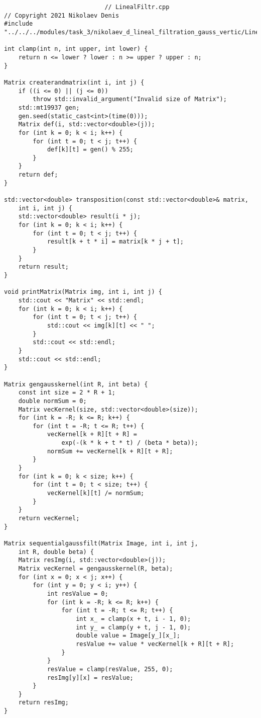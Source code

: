 \documentclass{report}
\begin{document}
\begin{lstlisting}
							// LinealFiltr.cpp
// Copyright 2021 Nikolaev Denis
#include "../../../modules/task_3/nikolaev_d_lineal_filtration_gauss_vertic/LinealFiltr.h"

int clamp(int n, int upper, int lower) {
    return n <= lower ? lower : n >= upper ? upper : n;
}

Matrix createrandmatrix(int i, int j) {
    if ((i <= 0) || (j <= 0))
        throw std::invalid_argument("Invalid size of Matrix");
    std::mt19937 gen;
    gen.seed(static_cast<int>(time(0)));
    Matrix def(i, std::vector<double>(j));
    for (int k = 0; k < i; k++) {
        for (int t = 0; t < j; t++) {
            def[k][t] = gen() % 255;
        }
    }
    return def;
}

std::vector<double> transposition(const std::vector<double>& matrix,
    int i, int j) {
    std::vector<double> result(i * j);
    for (int k = 0; k < i; k++) {
        for (int t = 0; t < j; t++) {
            result[k + t * i] = matrix[k * j + t];
        }
    }
    return result;
}

void printMatrix(Matrix img, int i, int j) {
    std::cout << "Matrix" << std::endl;
    for (int k = 0; k < i; k++) {
        for (int t = 0; t < j; t++) {
            std::cout << img[k][t] << " ";
        }
        std::cout << std::endl;
    }
    std::cout << std::endl;
}

Matrix gengausskernel(int R, int beta) {
    const int size = 2 * R + 1;
    double normSum = 0;
    Matrix vecKernel(size, std::vector<double>(size));
    for (int k = -R; k <= R; k++) {
        for (int t = -R; t <= R; t++) {
            vecKernel[k + R][t + R] =
                exp(-(k * k + t * t) / (beta * beta));
            normSum += vecKernel[k + R][t + R];
        }
    }
    for (int k = 0; k < size; k++) {
        for (int t = 0; t < size; t++) {
            vecKernel[k][t] /= normSum;
        }
    }
    return vecKernel;
}

Matrix sequentialgaussfilt(Matrix Image, int i, int j,
    int R, double beta) {
    Matrix resImg(i, std::vector<double>(j));
    Matrix vecKernel = gengausskernel(R, beta);
    for (int x = 0; x < j; x++) {
        for (int y = 0; y < i; y++) {
            int resValue = 0;
            for (int k = -R; k <= R; k++) {
                for (int t = -R; t <= R; t++) {
                    int x_ = clamp(x + t, i - 1, 0);
                    int y_ = clamp(y + t, j - 1, 0);
                    double value = Image[y_][x_];
                    resValue += value * vecKernel[k + R][t + R];
                }
            }
            resValue = clamp(resValue, 255, 0);
            resImg[y][x] = resValue;
        }
    }
    return resImg;
}


\end{lstlisting}
\end{document}
